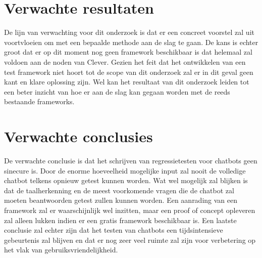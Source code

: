 \section{Verwachte resultaten}
\label{sec:verwachte_resultaten}

De lijn van verwachting voor dit onderzoek is dat er een concreet voorstel zal uit voortvloeien om met een bepaalde methode aan de slag te gaan. De kans is echter groot dat er op dit moment nog geen framework beschikbaar is dat helemaal zal voldoen aan de noden van Clever. Gezien het feit dat het ontwikkelen van een test framework niet hoort tot de scope van dit onderzoek zal er in dit geval geen kant en klare oplossing zijn. Wel kan het resultaat van dit onderzoek leiden tot een beter inzicht van hoe er aan de slag kan gegaan worden met de reeds bestaande frameworks.

\section{Verwachte conclusies}
\label{sec:verwachte_conclusies}

De verwachte conclusie is dat het schrijven van regressietesten voor chatbots geen sinecure is. Door de enorme hoeveelheid mogelijke input zal nooit de volledige chatbot telkens opnieuw getest kunnen worden. Wat wel mogelijk zal blijken is dat de taalherkenning en de meest voorkomende vragen die de chatbot zal moeten beantwoorden getest zullen kunnen worden. Een aanrading van een framework zal er waarschijnlijk wel inzitten, maar een proof of concept opleveren zal alleen lukken indien er een gratis framework beschikbaar is. Een laatste conclusie zal echter zijn dat het testen van chatbots een tijdsintensieve gebeurtenis zal blijven en dat er nog zeer veel ruimte zal zijn voor verbetering op het vlak van gebruiksvriendelijkheid.

